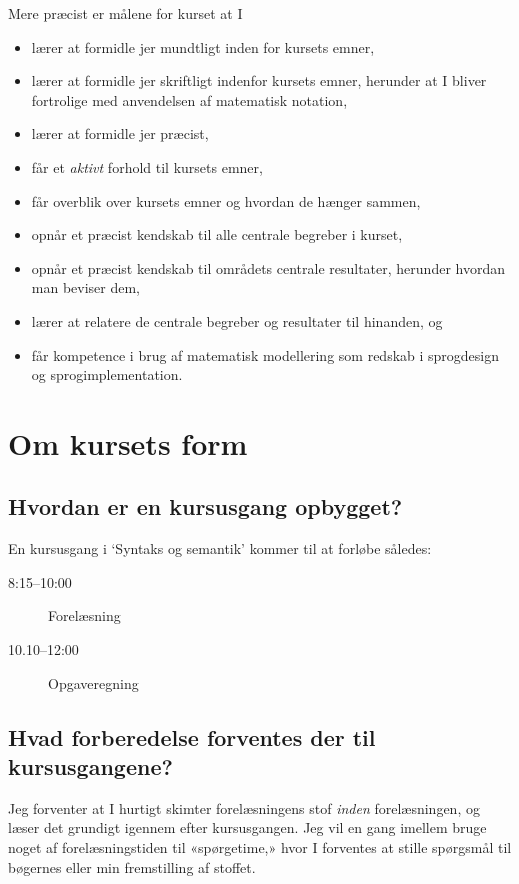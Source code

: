 \documentclass[11pt,a4paper,article,oneside]{memoir}
\begin{document}
Mere præcist er målene for kurset at I
\begin{itemize}
\firmlist
\item lærer at formidle jer mundtligt inden for kursets emner,
\item lærer at formidle jer skriftligt indenfor kursets emner, herunder at
  I bliver fortrolige med anvendelsen af matematisk notation,
\item lærer at formidle jer præcist,
\item får et \emph{aktivt} forhold til kursets emner,
\item får overblik over kursets emner og hvordan de hænger sammen,
\item opnår et præcist kendskab til alle centrale begreber i kurset,
\item opnår et præcist kendskab til områdets centrale resultater, herunder
  hvordan man beviser dem,
\item lærer at relatere de centrale begreber og resultater til hinanden,
  og
\item får kompetence i brug af matematisk modellering som redskab i
  sprogdesign og sprogimplementation.
\end{itemize} 


\chapter{Om kursets form}

\section{Hvordan er en kursusgang opbygget?} 

En kursusgang i `Syntaks og semantik' kommer til at forløbe således:
\begin{description}\item[8:15--10:00] Forelæsning
\item[10.10--12:00] Opgaveregning
\end{description} 

\section{Hvad forberedelse forventes der til kursusgangene?}

Jeg forventer at I hurtigt skimter forelæsningens stof \emph{inden}
forelæsningen, og læser det grundigt igennem efter kursusgangen. Jeg
vil en gang imellem bruge noget af forelæsningstiden til
«spørgetime,» hvor I forventes at stille spørgsmål til bøgernes
eller min fremstilling af stoffet.
\end{document}
